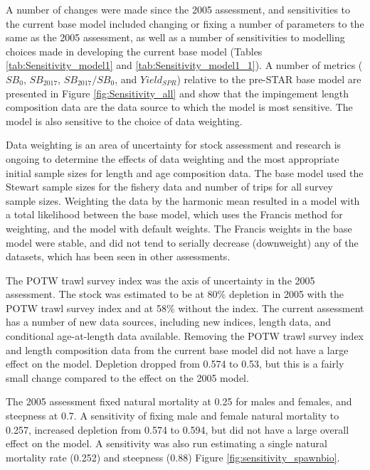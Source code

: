 \documentclass[12pt,]{article}
\begin{document}
A number of changes were made since the 2005 assessment, and
sensitivities to the current base model included changing or fixing a
number of parameters to the same as the 2005 assessment, as well as a
number of sensitivities to modelling choices made in developing the
current base model (Tables \ref{tab:Sensitivity_model1} and
\ref{tab:Sensitivity_model1_1}). A number of metrics (\(SB_0\),
\(SB_{2017}\), \(SB_{2017}/SB_0\), and \(Yield_{SPR}\)) relative to the
pre-STAR base model are presented in Figure \ref{fig:Sensitivity_all}
and show that the impingement length composition data are the data
source to which the model is most sensitive. The model is also sensitive
to the choice of data weighting.

Data weighting is an area of uncertainty for stock assessment and
research is ongoing to determine the effects of data weighting and the
most appropriate initial sample sizes for length and age composition
data. The base model used the Stewart sample sizes for the fishery data
and number of trips for all survey sample sizes. Weighting the data by
the harmonic mean resulted in a model with a total likelihood between
the base model, which uses the Francis method for weighting, and the
model with default weights. The Francis weights in the base model were
stable, and did not tend to serially decrease (downweight) any of the
datasets, which has been seen in other assessments.

The POTW trawl survey index was the axis of uncertainty in the 2005
assessment. The stock was estimated to be at 80\% depletion in 2005 with
the POTW trawl survey index and at 58\% without the index. The current
assessment has a number of new data sources, including new indices,
length data, and conditional age-at-length data available. Removing the
POTW trawl survey index and length composition data from the current
base model did not have a large effect on the model. Depletion dropped
from 0.574 to 0.53, but this is a fairly small change compared to the
effect on the 2005 model.

The 2005 assessment fixed natural mortality at 0.25 for males and
females, and steepness at 0.7. A sensitivity of fixing male and female
natural mortality to 0.257, increased depletion from 0.574 to 0.594, but
did not have a large overall effect on the model. A sensitivity was also
run estimating a single natural mortality rate (0.252) and steepness
(0.88) Figure \ref{fig:sensitivity_spawnbio}.
\end{document}
